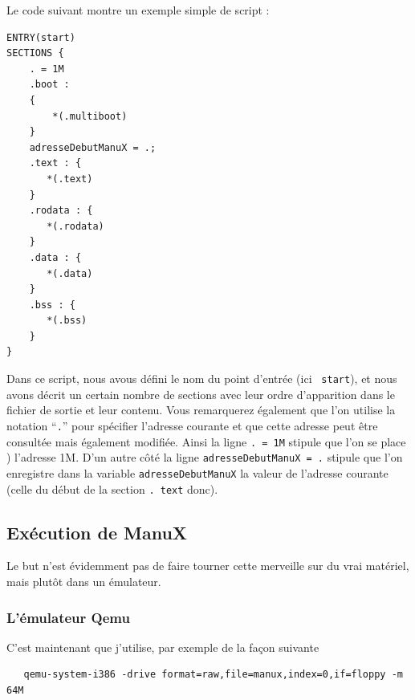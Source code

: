 
Le code suivant montre un exemple simple de script :

\begin{lstlisting}
ENTRY(start)
SECTIONS {
    . = 1M 
    .boot :
    {
        *(.multiboot)
    }
    adresseDebutManuX = .;
    .text : {
       *(.text)
    }        
    .rodata : {
       *(.rodata)
    }
    .data : {
       *(.data)
    }
    .bss : {
       *(.bss)
    }
}
\end{lstlisting}

   Dans ce script, nous avous défini le nom du point d'entrée (ici {\tt
  start}), et nous avons décrit un certain nombre de sections avec
leur ordre d'apparition dans le fichier de sortie et leur
contenu. Vous remarquerez également que l'on utilise la notation
``{\tt .}'' pour spécifier l'adresse courante et que cette adresse
peut être consultée mais également modifiée. Ainsi la ligne {\tt . =
  1M} stipule que l'on se place ) l'adresse 1M. D'un autre côté la
ligne {\tt adresseDebutManuX = .} stipule que l'on enregistre dans la
variable {\tt adresseDebutManuX} la valeur de l'adresse courante
(celle du début de la section {\tt . text} donc).


%
\subsection{Exécution de ManuX}
\label{section:execution}

   Le but n'est évidemment pas de faire tourner cette merveille sur du
vrai matériel, mais plutôt dans un émulateur.

%
\subsubsection{L'émulateur Qemu}

   C'est maintenant \qemu \cite{qemu-website}  que j'utilise, par exemple de la façon
suivante
   
\begin{lstlisting}
   qemu-system-i386 -drive format=raw,file=manux,index=0,if=floppy -m 64M
\end{lstlisting}

